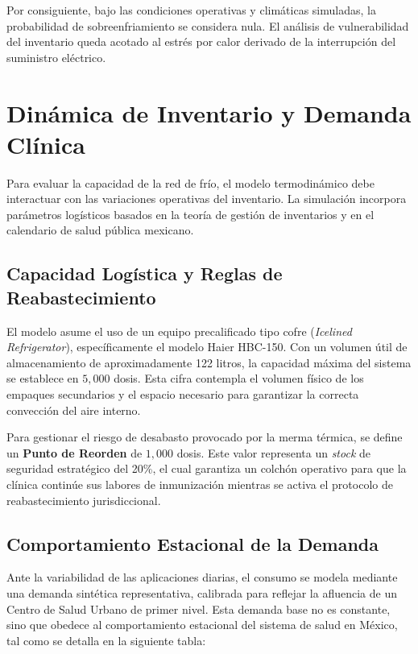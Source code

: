 \documentclass[
  spanish,
  us-letterpaper,
]{scrreprt}
\numberwithin{equation}{section}
\theoremstyle{plain}
\theoremstyle{plain}
\theoremstyle{plain}
\theoremstyle{definition}
\theoremstyle{remark}
\begin{document}
Por consiguiente, bajo las condiciones operativas y climáticas
simuladas, la probabilidad de sobreenfriamiento se considera nula. El
análisis de vulnerabilidad del inventario queda acotado al estrés por
calor derivado de la interrupción del suministro eléctrico.

\section{Dinámica de Inventario y Demanda
Clínica}\label{sec-dinamica-inventario}

Para evaluar la capacidad de la red de frío, el modelo termodinámico
debe interactuar con las variaciones operativas del inventario. La
simulación incorpora parámetros logísticos basados en la teoría de
gestión de inventarios y en el calendario de salud pública mexicano.

\subsection{Capacidad Logística y Reglas de
Reabastecimiento}\label{capacidad-loguxedstica-y-reglas-de-reabastecimiento}

El modelo asume el uso de un equipo precalificado tipo cofre
(\emph{Icelined Refrigerator}), específicamente el modelo Haier HBC-150.
Con un volumen útil de almacenamiento de aproximadamente 122 litros, la
capacidad máxima del sistema se establece en \(5,000\) dosis. Esta cifra
contempla el volumen físico de los empaques secundarios y el espacio
necesario para garantizar la correcta convección del aire interno.

Para gestionar el riesgo de desabasto provocado por la merma térmica, se
define un \textbf{Punto de Reorden} de \(1,000\) dosis. Este valor
representa un \emph{stock} de seguridad estratégico del 20\%, el cual
garantiza un colchón operativo para que la clínica continúe sus labores
de inmunización mientras se activa el protocolo de reabastecimiento
jurisdiccional.

\subsection{Comportamiento Estacional de la
Demanda}\label{comportamiento-estacional-de-la-demanda}

Ante la variabilidad de las aplicaciones diarias, el consumo se modela
mediante una demanda sintética representativa, calibrada para reflejar
la afluencia de un Centro de Salud Urbano de primer nivel. Esta demanda
base no es constante, sino que obedece al comportamiento estacional del
sistema de salud en México, tal como se detalla en la siguiente tabla:
\end{document}
